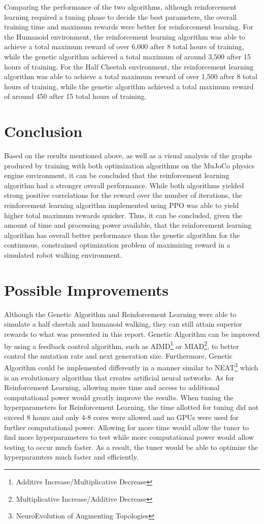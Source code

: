 \documentclass{article}
\begin{document}
    Comparing the performance of the two algorithms, although reinforcement learning required a tuning phase to decide the best parameters, the overall training time and maximum rewards were better for reinforcement learning. For the Humanoid environment, the reinforcement learning algorithm was able to achieve a total maximum reward of over 6,000 after 8 total hours of training, while the genetic algorithm achieved a total maximum of around 3,500 after 15 hours of training. For the Half Cheetah environment, the reinforcement learning algorithm was able to achieve a total maximum reward of over 1,500 after 8 total hours of training, while the genetic algorithm achieved a total maximum reward of around 450 after 15 total hours of training.
    
    
\section{Conclusion}
    Based on the results mentioned above, as well as a visual analysis of the graphs produced by training with both optimization algorithms on the MuJoCo physics engine environment, it can be concluded that the reinforcement learning algorithm had a stronger overall performance. While both algorithms yielded strong positive correlations for the reward over the number of iterations, the reinforcement learning algorithm implemented using PPO was able to yield higher total maximum rewards quicker. Thus, it can be concluded, given the amount of time and processing power available, that the reinforcement learning algorithm has overall better performance than the genetic algorithm for the continuous, constrained optimization problem of maximizing reward in a simulated robot walking environment.
    
\section{Possible Improvements}
    Although the Genetic Algorithm and Reinforcement Learning were able to simulate a half cheetah and humanoid walking, they can still attain superior rewards to what was presented in this report. Genetic Algorithm can be improved by using a feedback control algorithm, such as AIMD\footnote{Additive Increase/Multiplicative Decrease} or MIAD\footnote{Multiplicative Increase/Additive Decrease}, to better control the mutation rate and next generation size. Furthermore, Genetic Algorithm could be implemented differently in a manner similar to NEAT\footnote{NeuroEvolution of Augmenting Topologies} which is an evolutionary algorithm that creates artificial neural networks\cite{neat}. As for Reinforcement Learning, allowing more time and access to additional computational power would greatly improve the results. When tuning the hyperparameters for Reinforcement Learning, the time allotted for tuning did not exceed 8 hours and only 4-8 cores were allowed and no GPUs were used for further computational power. Allowing for more time would allow the tuner to find more hyperparameters to test while more computational power would allow testing to occur much faster. As a result, the tuner would be able to optimize the hyperparamters much faster and efficiently. 
    


\end{document}
